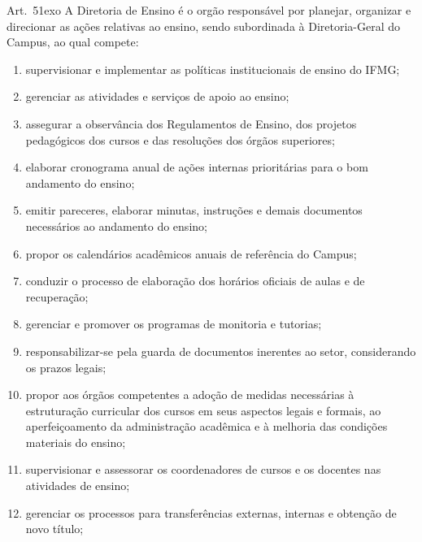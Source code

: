 \documentclass[a4paper,12pt]{report}
\newcommand{\ORD}[2]{#1\raise1ex\hbox{\scriptsize#2}}
\begin{document}
Art.~\ORD{5}{o} A Diretoria de Ensino é o orgão responsável por planejar, organizar e 
direcionar as ações relativas ao ensino, sendo subordinada à Diretoria-Geral do Campus, 
ao qual compete:

\begin{enumerate}
\renewcommand{\labelenumi}{\Roman{enumi}}

\item supervisionar e implementar as políticas institucionais de ensino do IFMG;

\item gerenciar as atividades e serviços de apoio ao ensino;

\item assegurar a observância dos Regulamentos de Ensino, dos projetos pedagógicos dos 
     cursos e das resoluções dos órgãos superiores;

\item elaborar cronograma anual de ações internas prioritárias para o bom andamento do 
      ensino;

\item emitir pareceres, elaborar minutas, instruções e demais documentos necessários ao 
      andamento do ensino;

\item propor os calendários acadêmicos anuais de referência do Campus;

\item conduzir o processo de elaboração dos horários oficiais de aulas e de recuperação;

\item gerenciar e promover os programas de monitoria e tutorias;

\item responsabilizar-se pela guarda de documentos inerentes ao setor, considerando os 
      prazos legais;

\item propor aos órgãos competentes a adoção de medidas necessárias à estruturação 
      curricular dos cursos em seus aspectos legais e formais, ao aperfeiçoamento 
      da administração acadêmica e à melhoria das condições materiais do ensino;

\item supervisionar e assessorar os coordenadores de cursos e os docentes nas atividades 
      de ensino;

\item gerenciar os processos para transferências externas, internas e obtenção de novo 
     título;


\end{enumerate}
\end{document}
